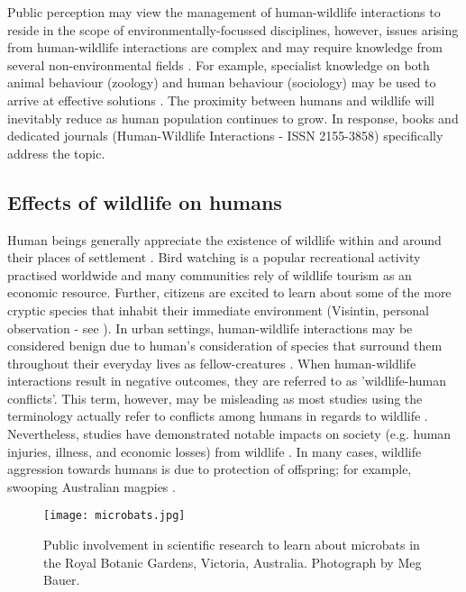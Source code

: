 Public perception may view the management of human-wildlife interactions to reside in the scope of environmentally-focussed disciplines, however, issues arising from human-wildlife interactions are complex and may require knowledge from several non-environmental fields \citep{deck97,madd04}. For example, specialist knowledge on both animal behaviour (zoology) and human behaviour (sociology) may be used to arrive at effective solutions \citep{dicka10}. The proximity between humans and wildlife will inevitably reduce as human population continues to grow. In response, books \cite{manf08} and dedicated journals (Human-Wildlife Interactions - ISSN 2155-3858) specifically address the topic.

\subsection{Effects of wildlife on humans}

Human beings generally appreciate the existence of wildlife within and around their places of settlement \citep{dick86,kell93,news05,raad07}. Bird watching is a popular recreational activity practised worldwide and many communities rely of wildlife tourism as an economic resource. Further, citizens are excited to learn about some of the more cryptic species that inhabit their immediate environment (Visintin, personal observation - see ). In urban settings, human-wildlife interactions may be considered benign due to human's consideration of species that surround them throughout their everyday lives as fellow-creatures \citep{zinn08}. When human-wildlife interactions result in negative outcomes, they are referred to as 'wildlife-human conflicts'. This term, however, may be misleading as most studies using the terminology actually refer to conflicts among humans in regards to wildlife \citep{pete10}. Nevertheless, studies have demonstrated notable impacts on society (e.g. human injuries, illness, and economic losses) from wildlife \citep{cono95}. In many cases, wildlife aggression towards humans is due to protection of offspring; for example, swooping Australian magpies \citep{jone99}.

\begin{figure*}[htp]
  \centering
  \texttt{[image: microbats.jpg]}
  \caption[Public involvement with wildlife]{Public involvement in scientific research to learn about microbats in the Royal Botanic Gardens, Victoria, Australia. Photograph by Meg Bauer.}
  \label{microbats}
\end{figure*}

